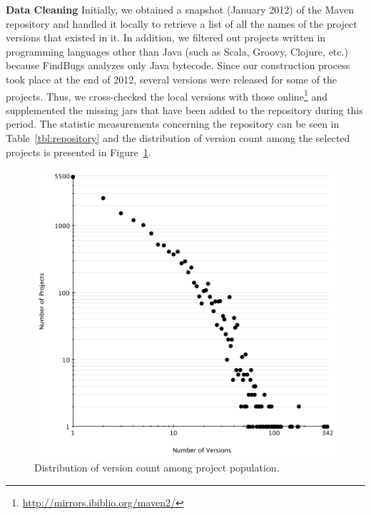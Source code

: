 \documentclass{sig-alternate}
\begin{document}
{\bf Data Cleaning} Initially, we obtained a snapshot
(January 2012) of the Maven repository and handled it
locally to retrieve a list
of all the names of the project versions that existed in
it. In addition, we filtered out projects written in programming
languages other than Java (such as Scala, Groovy, Clojure, etc.)
because FindBugs analyzes only Java bytecode.
Since our construction process took place at the end of 2012,
several versions were released for some of the projects.
Thus, we cross-checked
the local versions with those online\footnote{\small \url{http://mirrors.ibiblio.org/maven2/}}
and supplemented the missing {\sc jar}s that have been
added to the repository during this period.
The statistic measurements concerning
the repository can be seen in Table~\ref{tbl:repository}
and the distribution of version
count among the selected projects is
presented in Figure~\ref{fig:version-count}.

\begin{figure}[t]
	\centering
	\includegraphics[scale=0.37]{version_count.pdf}
	\caption{Distribution of version count among project population.}
	\label{fig:version-count}
\end{figure}


\end{document}
